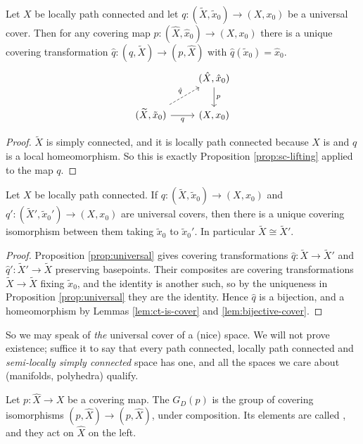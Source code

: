 \documentclass[a4paper]{scrartcl}
\begin{document}
\begin{proposition} \label{prop:universal}
	Let $X$ be locally path connected and let $q: (\widetilde X, \tilde x_0) \to (X, x_0)$ be a universal cover. Then for any covering map $p: (\hat X, \hat x_0) \to (X, x_0)$ there is a unique covering transformation $\hat q: (q, \widetilde X) \to (p, \hat X)$ with $\hat q (\tilde x_0) = \hat x_0$.
	\[\begin{tikzcd}
		& {(\hat X, \hat x_0)} \arrow[d, "p"] \\
		{(\widetilde X, \tilde x_0)} \arrow[r, "q"'] \arrow[ru, "{\hat q}", dashed] & {(X, x_0)}
	\end{tikzcd}\]
\end{proposition}
\begin{proof}
	$\widetilde X$ is simply connected, and it is locally path connected because $X$ is and $q$ is a local homeomorphism. So this is exactly Proposition \ref{prop:sc-lifting} applied to the map $q$.
\end{proof}

\begin{corollary}
	Let $X$ be locally path connected. If $q: (\widetilde X, \tilde x_0) \to (X,x_0)$ and $q': (\widetilde X', \tilde x_0') \to (X, x_0)$ are universal covers, then there is a unique covering isomorphism between them taking $\tilde x_0$ to $\tilde x_0'$. In particular $\widetilde X \cong \widetilde X'$.
\end{corollary}
\begin{proof}
	Proposition \ref{prop:universal} gives covering transformations $\hat q: \widetilde X \to \widetilde X'$ and $\hat q': \widetilde X' \to \widetilde X$ preserving basepoints. Their composites are covering transformations $\widetilde X \to \widetilde X$ fixing $\tilde x_0$, and the identity is another such, so by the uniqueness in Proposition \ref{prop:universal} they are the identity. Hence $\hat q$ is a bijection, and a homeomorphism by Lemmas \ref{lem:ct-is-cover} and \ref{lem:bijective-cover}.
\end{proof}

So we may speak of \emph{the} universal cover of a (nice) space. We will not prove
existence; suffice it to say that every path connected, locally path connected and
\emph{semi-locally simply connected} space has one, and all the spaces we care about
(manifolds, polyhedra) qualify.

\begin{definition}
	Let $p: \hat X \to X$ be a covering map. The  $G_D(p)$ is the group of covering isomorphisms $(p, \hat X) \to (p, \hat X)$, under composition. Its elements are called , and they act on $\hat X$ on the left.
\end{definition}
\end{document}
